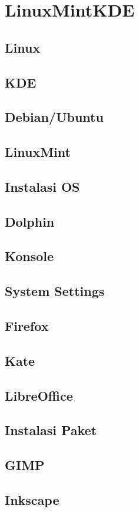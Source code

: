 \documentclass[11pt,fleqn]{book} %
\begin{document}
\newpage
{} %
\chapter{LinuxMintKDE}
\section{Linux}
\section{KDE}
\section{Debian/Ubuntu}
\section{LinuxMint}
\section{Instalasi OS}
\section{Dolphin}
\section{Konsole}
\section{System Settings}
\section{Firefox}
\section{Kate}
\section{LibreOffice}
\section{Instalasi Paket}
\section{GIMP}
\section{Inkscape}
\end{document}
